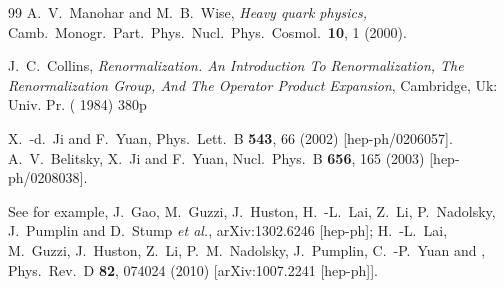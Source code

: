 \documentclass[aps,prd,preprint,tightenlines,superscriptaddress]{revtex4}
\begin{document}
\begin{thebibliography}{99}
  A.~V.~Manohar and M.~B.~Wise,
  {\it Heavy quark physics,}
  Camb.\ Monogr.\ Part.\ Phys.\ Nucl.\ Phys.\ Cosmol.\  {\bf 10}, 1 (2000).

  J.~C.~Collins,
  {\it Renormalization. An Introduction To Renormalization, The Renormalization Group, And The Operator Product Expansion},
  Cambridge, Uk: Univ. Pr. ( 1984) 380p

  X.~-d.~Ji and F.~Yuan,
  Phys.\ Lett.\ B {\bf 543}, 66 (2002)
  [hep-ph/0206057].
  A.~V.~Belitsky, X.~Ji and F.~Yuan,
  Nucl.\ Phys.\ B {\bf 656}, 165 (2003)
  [hep-ph/0208038].


See for example,
  J.~Gao, M.~Guzzi, J.~Huston, H.~-L.~Lai, Z.~Li, P.~Nadolsky, J.~Pumplin and D.~Stump {\it et al.},
  arXiv:1302.6246 [hep-ph];
  H.~-L.~Lai, M.~Guzzi, J.~Huston, Z.~Li, P.~M.~Nadolsky, J.~Pumplin, C.~-P.~Yuan and ,
  Phys.\ Rev.\ D {\bf 82}, 074024 (2010)
  [arXiv:1007.2241 [hep-ph]].


\end{thebibliography}
\end{document}
